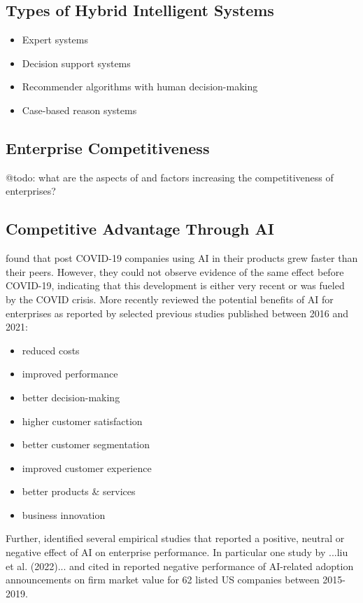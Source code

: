 \subsection{Types of Hybrid Intelligent Systems}

\begin{itemize}
    \item Expert systems 
    \item Decision support systems
    \item Recommender algorithms with human decision-making
    \item Case-based reason systems
\end{itemize}

\subsection{Enterprise Competitiveness}

{\color{purple} @todo: what are the aspects of and factors increasing the competitiveness of enterprises?}


\subsection{Competitive Advantage Through AI}

\cite{xuCanArtificialIntelligence2021} found that post COVID-19 companies using AI in their products grew
faster than their peers. However, they could not observe evidence of the same effect before COVID-19, indicating
that this development is either very recent or was fueled by the COVID crisis. More recently
\cite{hoArtificialIntelligenceFirm2022} reviewed the potential benefits of AI for enterprises as reported
by selected previous studies published between 2016 and 2021:

\begin{itemize}
    \item reduced costs
    \item improved performance
    \item better decision-making
    \item higher customer satisfaction
    \item better customer segmentation
    \item improved customer experience
    \item better products \& services
    \item business innovation
\end{itemize}

Further, \cite{hoArtificialIntelligenceFirm2022} identified several empirical studies that reported a positive,
neutral or negative effect of AI on enterprise performance. In particular one study by ...liu et al. (2022)...
and cited in \cite{hoArtificialIntelligenceFirm2022} reported negative performance of AI-related adoption 
announcements on firm market value for 62 listed US companies between 2015-2019.
